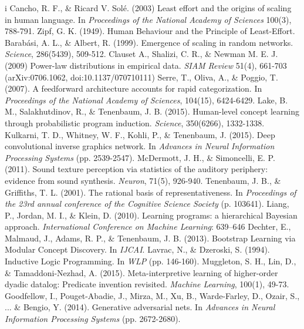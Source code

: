 \documentclass[11pt,letterpaper]{article}
\begin{document}
\begin{thebibliography}{}
   i Cancho, R. F., \& Ricard V. Solé. (2003)
    Least effort and the origins of scaling in human language.
    In \emph{Proceedings of the National Academy of Sciences} 100(3), 788-791.
   Zipf, G. K. (1949).
    Human Behaviour and the Principle of Least-Effort.
    Barab\'asi, A. L., \& Albert, R. (1999).
    Emergence of scaling in random networks.
    \emph{Science}, 286(5439), 509-512.
   Clauset A., Shalizi, C. R., \& Newman M. E. J.  (2009)
    Power-law distributions in empirical data.
    \emph{SIAM Review} 51(4), 661-703 (arXiv:0706.1062, doi:10.1137/070710111)
    Serre, T., Oliva, A., \& Poggio, T. (2007).
    A feedforward architecture accounts for rapid categorization.
    In \emph{Proceedings of the National Academy of Sciences}, 104(15), 6424-6429.
   Lake, B. M., Salakhutdinov, R., \& Tenenbaum, J. B. (2015).
    Human-level concept learning through probabilistic program induction.
    \emph{Science}, 350(6266), 1332-1338.
    Kulkarni, T. D., Whitney, W. F., Kohli, P., \& Tenenbaum, J. (2015).
    Deep convolutional inverse graphics network.
    In \emph{Advances in Neural Information Processing Systems} (pp. 2539-2547).
    McDermott, J. H., \& Simoncelli, E. P. (2011).
    Sound texture perception via statistics of the auditory periphery:
    evidence from sound synthesis.
    \emph{Neuron}, 71(5), 926-940.
    Tenenbaum, J. B., \& Griffiths, T. L. (2001).
    The rational basis of representativeness.
    In \emph{Proceedings of the 23rd annual conference of the Cognitive
    Science Society} (p. 103641).
    Liang, P., Jordan, M. I., \& Klein, D. (2010).
    Learning programs: a hierarchical Bayesian approach.
    \emph{International Conference on Machine Learning}: 639–646
    Dechter, E., Malmaud, J., Adams, R. P., \& Tenenbaum, J. B. (2013).
    Bootstrap Learning via Modular Concept Discovery.
    In \emph{IJCAI}.
    Lavrac, N., \& Dzeroski, S. (1994).
    Inductive Logic Programming.
    In \emph{WLP} (pp. 146-160).
    Muggleton, S. H., Lin, D., \& Tamaddoni-Nezhad, A. (2015).
    Meta-interpretive learning of higher-order dyadic datalog: Predicate
    invention revisited.
    \emph{Machine Learning}, 100(1), 49-73.
    Goodfellow, I., Pouget-Abadie, J., Mirza, M., Xu, B., Warde-Farley, D.,
    Ozair, S., ... \& Bengio, Y. (2014).
    Generative adversarial nets.
    In \emph{Advances in Neural Information Processing Systems} (pp.
    2672-2680).
\end{thebibliography}
\end{document}
